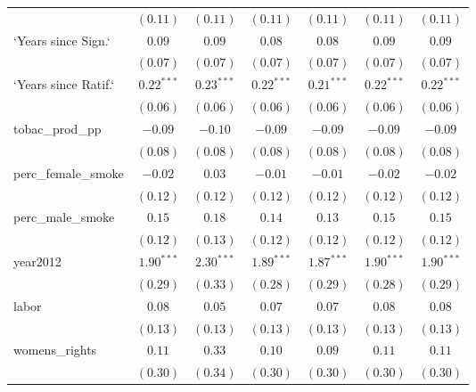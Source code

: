 \begin{table}[!h]
\begin{center}
\begin{tabular}{l c c c c c c }
                        & $(0.11)$     & $(0.11)$     & $(0.11)$     & $(0.11)$     & $(0.11)$     & $(0.11)$     \\
`Years since Sign.`     & $0.09$       & $0.09$       & $0.08$       & $0.08$       & $0.09$       & $0.09$       \\
                        & $(0.07)$     & $(0.07)$     & $(0.07)$     & $(0.07)$     & $(0.07)$     & $(0.07)$     \\
`Years since Ratif.`    & $0.22^{***}$ & $0.23^{***}$ & $0.22^{***}$ & $0.21^{***}$ & $0.22^{***}$ & $0.22^{***}$ \\
                        & $(0.06)$     & $(0.06)$     & $(0.06)$     & $(0.06)$     & $(0.06)$     & $(0.06)$     \\
tobac\_prod\_pp         & $-0.09$      & $-0.10$      & $-0.09$      & $-0.09$      & $-0.09$      & $-0.09$      \\
                        & $(0.08)$     & $(0.08)$     & $(0.08)$     & $(0.08)$     & $(0.08)$     & $(0.08)$     \\
perc\_female\_smoke     & $-0.02$      & $0.03$       & $-0.01$      & $-0.01$      & $-0.02$      & $-0.02$      \\
                        & $(0.12)$     & $(0.12)$     & $(0.12)$     & $(0.12)$     & $(0.12)$     & $(0.12)$     \\
perc\_male\_smoke       & $0.15$       & $0.18$       & $0.14$       & $0.13$       & $0.15$       & $0.15$       \\
                        & $(0.12)$     & $(0.13)$     & $(0.12)$     & $(0.12)$     & $(0.12)$     & $(0.12)$     \\
year2012                & $1.90^{***}$ & $2.30^{***}$ & $1.89^{***}$ & $1.87^{***}$ & $1.90^{***}$ & $1.90^{***}$ \\
                        & $(0.29)$     & $(0.33)$     & $(0.28)$     & $(0.29)$     & $(0.28)$     & $(0.29)$     \\
labor                   & $0.08$       & $0.05$       & $0.07$       & $0.07$       & $0.08$       & $0.08$       \\
                        & $(0.13)$     & $(0.13)$     & $(0.13)$     & $(0.13)$     & $(0.13)$     & $(0.13)$     \\
womens\_rights          & $0.11$       & $0.33$       & $0.10$       & $0.09$       & $0.11$       & $0.11$       \\
                        & $(0.30)$     & $(0.34)$     & $(0.30)$     & $(0.30)$     & $(0.30)$     & $(0.30)$     \\

\end{tabular}
\end{center}
\end{table}
